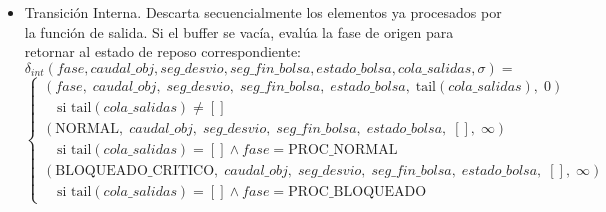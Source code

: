 \begin{itemize}
    \[
    Q_{bolsa} = \begin{cases} [(\top, out\_detener\_bomba), (\text{DETENCION\_MEDICA}, out\_registrar\_evento)] & \text{si } sb' = 60.0 \\ [ ] & \text{en otro caso} \end{cases}
    \]
    La cola agregada unificada resultante se expresa mediante la concatenación directa de ambos buffers de falla:
    \[ Q_{nuevas} = Q_{desvio} \mathbin{++} Q_{bolsa} \]
     \\Puesto que las comprobaciones de desvío y fin de bolsa son ortogonales, podrían cumplirse simultáneamente (ej. alarma media en el mismo segundo exacto del límite de 60s de la bolsa). Sumar ambas colas garantiza matemáticamente que el componente emitirá todas las acciones en ráfaga ($\sigma=0$) sin pérdida de información ni condiciones de carrera.

    \item Transición Interna. Descarta secuencialmente los elementos ya procesados por la función de salida. Si el buffer se vacía, evalúa la fase de origen para retornar al estado de reposo correspondiente:
\[
    \delta_{int}(fase, caudal\_obj, seg\_desvio, seg\_fin\_bolsa, estado\_bolsa, cola\_salidas, \sigma) =
    \]
    \[
    \begin{cases}
    (fase,\; caudal\_obj,\; seg\_desvio,\; seg\_fin\_bolsa,\; estado\_bolsa,\; \text{tail}(cola\_salidas),\; 0) \\
    \quad \text{si } \text{tail}(cola\_salidas) \neq [ ] \\[2ex]
    (\text{NORMAL},\; caudal\_obj,\; seg\_desvio,\; seg\_fin\_bolsa,\; estado\_bolsa,\; [ ],\; \infty) \\
    \quad \text{si } \text{tail}(cola\_salidas) = [ ] \land fase = \text{PROC\_NORMAL} \\[2ex]
    (\text{BLOQUEADO\_CRITICO},\; caudal\_obj,\; seg\_desvio,\; seg\_fin\_bolsa,\; estado\_bolsa,\; [ ],\; \infty) \\
    \quad \text{si } \text{tail}(cola\_salidas) = [ ] \land fase = \text{PROC\_BLOQUEADO}
    \end{cases}
    \]
      

\end{itemize}
